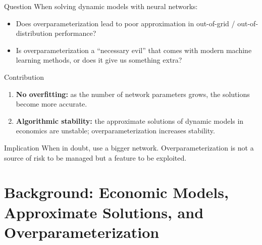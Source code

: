 \documentclass[aspectratio=169,10pt]{beamer}
\newcommand{\emphcolor}[1]{\textbf{\textcolor{emphcolorval}{#1}}}
\begin{document}
\begin{frame}{Question}
	When solving dynamic models with neural networks:
	\begin{itemize}
		\item Does overparameterization lead to poor approximation in out-of-grid / out-of-distribution performance?
		\vspace{0.1in}
		\item Is overparameterization a ``necessary evil'' that comes with modern machine learning methods, or does it give us something extra?
		
	\end{itemize}
\end{frame}

\begin{frame}{Contribution}
	\begin{enumerate}
		\item \emphcolor{No overfitting:} as the number of network parameters grows, the solutions become more accurate.
		\vspace{0.1in}
		\item \emphcolor{Algorithmic stability:} the approximate solutions of dynamic models in economics are unstable; overparameterization increases stability.
	\end{enumerate}
	\begin{block}{Implication}
		When in doubt, use a bigger network. Overparameterization is not a source of risk to be managed but a feature to be exploited.
	\end{block}
\end{frame}

\section{\textcolor{KahouBlack}{Background: Economic Models, Approximate Solutions, and Overparameterization}}
\end{document}

